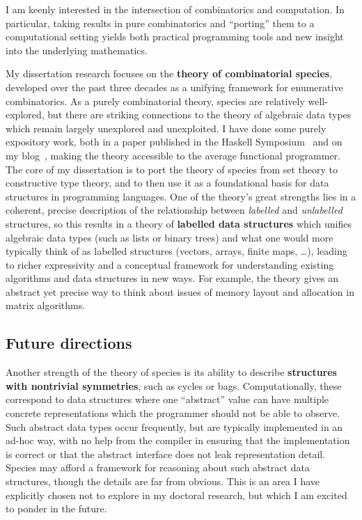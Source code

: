 \documentclass[12pt]{article}
\begin{document}
I am keenly interested in the intersection of combinatorics and
computation.  In particular, taking results in pure combinatorics and
``porting'' them to a computational setting yields both practical
programming tools and new insight into the underlying mathematics.

My dissertation research focuses on the \textbf{theory of
  combinatorial species}, developed over the past three decades as a
unifying framework for enumerative combinatorics. As a purely
combinatorial theory, species are relatively well-explored, but there
are striking connections to the theory of algebraic data types which
remain largely unexplored and unexploited. I have done some purely
expository work, both in a paper published in the Haskell
Symposium~\cite{yorgey2010species} and on my blog~\cite{blog}, making the
theory accessible to the average functional programmer.  The core of
my dissertation is to port the theory of species from set theory to
constructive type theory, and to then use it as a foundational basis
for data structures in programming languages. One of the theory's
great strengths lies in a coherent, precise description of the
relationship between \emph{labelled} and \emph{unlabelled} structures,
so this results in a theory of \textbf{labelled data structures} which
unifies algebraic data types (such as lists or binary trees) and what
one would more typically think of as labelled structures (vectors,
arrays, finite maps, \dots), leading to richer expressivity and a
conceptual framework for understanding existing algorithms and data
structures in new ways.  For example, the theory gives an abstract yet
precise way to think about issues of memory layout and allocation in
matrix algorithms.

\subsection*{Future directions}

Another strength of the theory of species is its ability to describe
\textbf{structures with nontrivial symmetries}, such as cycles or
bags.  Computationally, these correspond to data structures where one
``abstract'' value can have multiple concrete representations which
the programmer should not be able to observe.  Such abstract data
types occur frequently, but are typically implemented in an ad-hoc
way, with no help from the compiler in ensuring that the
implementation is correct or that the abstract interface does not leak
representation detail.  Species may afford a framework for reasoning
about such abstract data structures, though the details are far from
obvious.  This is an area I have explicitly chosen not to explore in
my doctoral research, but which I am excited to ponder in the future.
\end{document}

